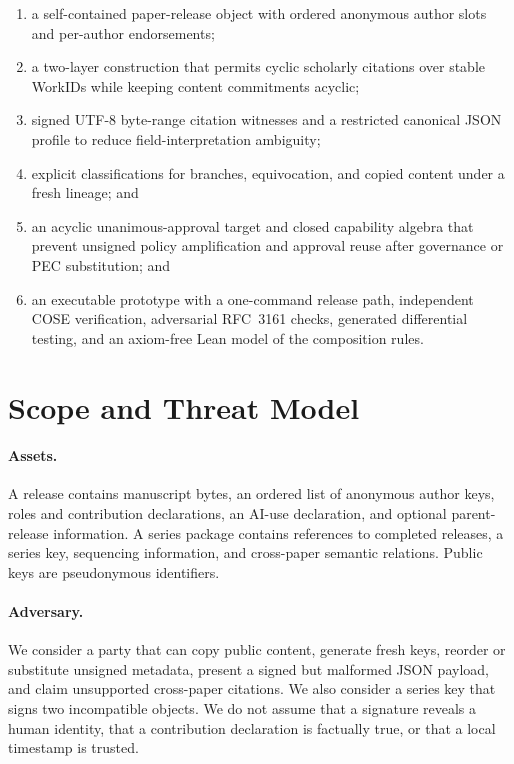 \documentclass[11pt]{article}
\newcommand{\workid}{\textsf{WorkID}}
\begin{document}
\begin{enumerate}
  \item a self-contained paper-release object with ordered anonymous author slots and per-author endorsements;
  \item a two-layer construction that permits cyclic scholarly citations over stable \workid s while keeping content commitments acyclic;
  \item signed UTF-8 byte-range citation witnesses and a restricted canonical JSON profile to reduce field-interpretation ambiguity;
  \item explicit classifications for branches, equivocation, and copied content under a fresh lineage; and
  \item an acyclic unanimous-approval target and closed capability algebra that prevent unsigned policy amplification and approval reuse after governance or PEC substitution; and
  \item an executable prototype with a one-command release path, independent COSE verification, adversarial RFC~3161 checks, generated differential testing, and an axiom-free Lean model of the composition rules.
\end{enumerate}

\section{Scope and Threat Model}

\paragraph{Assets.} A release contains manuscript bytes, an ordered list of anonymous author keys, roles and contribution declarations, an AI-use declaration, and optional parent-release information. A series package contains references to completed releases, a series key, sequencing information, and cross-paper semantic relations. Public keys are pseudonymous identifiers.

\paragraph{Adversary.} We consider a party that can copy public content, generate fresh keys, reorder or substitute unsigned metadata, present a signed but malformed JSON payload, and claim unsupported cross-paper citations. We also consider a series key that signs two incompatible objects. We do not assume that a signature reveals a human identity, that a contribution declaration is factually true, or that a local timestamp is trusted.
\end{document}
